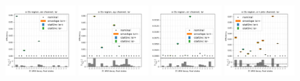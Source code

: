 \begin{figure}
    \includegraphics[width=0.24\textwidth]{chapters/Appendix/sectionTTSyst/figures/afterCorr/icata2_ch0_isr.png}
    \includegraphics[width=0.24\textwidth]{chapters/Appendix/sectionTTSyst/figures/afterCorr/icata2_ch1_isr.png}
    \includegraphics[width=0.24\textwidth]{chapters/Appendix/sectionTTSyst/figures/afterCorr/icata2_ch2_isr.png}
    \includegraphics[width=0.24\textwidth]{chapters/Appendix/sectionTTSyst/figures/afterCorr/icata2_ch3_isr.png}


\end{figure}
